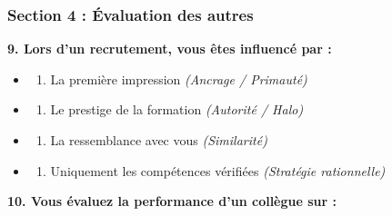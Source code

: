 \documentclass[
]{article}
\providecommand{\tightlist}{%
  \setlength{\itemsep}{0pt}\setlength{\parskip}{0pt}}
\begin{document}
\subsubsection{Section 4 : Évaluation des
autres}\label{section-4-uxe9valuation-des-autres}

\textbf{9. Lors d'un recrutement, vous êtes influencé par :}

\begin{itemize}
\tightlist
\item
  \begin{enumerate}
  \def\labelenumi{\alph{enumi})}
  \tightlist
  \item
    La première impression \emph{(Ancrage / Primauté)}
  \end{enumerate}
\item
  \begin{enumerate}
  \def\labelenumi{\alph{enumi})}
  \setcounter{enumi}{1}
  \tightlist
  \item
    Le prestige de la formation \emph{(Autorité / Halo)}
  \end{enumerate}
\item
  \begin{enumerate}
  \def\labelenumi{\alph{enumi})}
  \setcounter{enumi}{2}
  \tightlist
  \item
    La ressemblance avec vous \emph{(Similarité)}
  \end{enumerate}
\item
  \begin{enumerate}
  \def\labelenumi{\alph{enumi})}
  \setcounter{enumi}{3}
  \tightlist
  \item
    Uniquement les compétences vérifiées \emph{(Stratégie rationnelle)}
  \end{enumerate}
\end{itemize}

\textbf{10. Vous évaluez la performance d'un collègue sur :}
\end{document}
